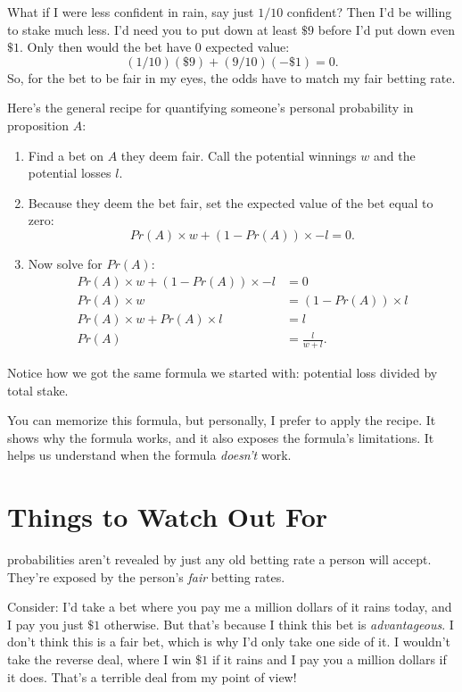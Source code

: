 \documentclass[justified]{tufte-book}
\providecommand{\tightlist}{%
  \setlength{\itemsep}{0pt}\setlength{\parskip}{0pt}}
\newcommand{\p}{Pr}
\theoremstyle{definition}
\theoremstyle{definition}
\theoremstyle{definition}
\theoremstyle{remark}
\begin{document}
What if I were less confident in rain, say just \(1/10\) confident? Then
I'd be willing to stake much less. I'd need you to put down at least
\(\$9\) before I'd put down even \(\$1\). Only then would the bet have
\(0\) expected value: \[ (1/10)(\$9) + (9/10)(-\$1) = 0. \] So, for the
bet to be fair in my eyes, the odds have to match my fair betting rate.

Here's the general recipe for quantifying someone's personal probability
in proposition \(A\):

\begin{enumerate}
\def\labelenumi{\arabic{enumi}.}
\tightlist
\item
  Find a bet on \(A\) they deem fair. Call the potential winnings \(w\)
  and the potential losses \(l\).
\item
  Because they deem the bet fair, set the expected value of the bet
  equal to zero: \[ \p(A) \times w + (1-\p(A)) \times -l = 0. \]
\item
  Now solve for \(\p(A)\): \[
     \begin{aligned}
       \p(A) \times w + (1-\p(A)) \times -l &= 0 \\
                             \p(A) \times w &= (1-\p(A)) \times l \\
            \p(A) \times w + \p(A) \times l &= l \\
                                      \p(A) &= \frac{l}{w + l}.
     \end{aligned}
   \]
\end{enumerate}

Notice how we got the same formula we started with: potential loss
divided by total stake.

You can memorize this formula, but personally, I prefer to apply the
recipe. It shows why the formula works, and it also exposes the
formula's limitations. It helps us understand when the formula
\emph{doesn't} work.

\hypertarget{things-to-watch-out-for}{%
\section{Things to Watch Out For}\label{things-to-watch-out-for}}

 probabilities aren't revealed by just any old
betting rate a person will accept. They're exposed by the person's
\emph{fair} betting rates.

Consider: I'd take a bet where you pay me a million dollars of it rains
today, and I pay you just \(\$1\) otherwise. But that's because I think
this bet is \emph{advantageous}. I don't think this is a fair bet, which
is why I'd only take one side of it. I wouldn't take the reverse deal,
where I win \(\$1\) if it rains and I pay you a million dollars if it
does. That's a terrible deal from my point of view!
\end{document}
